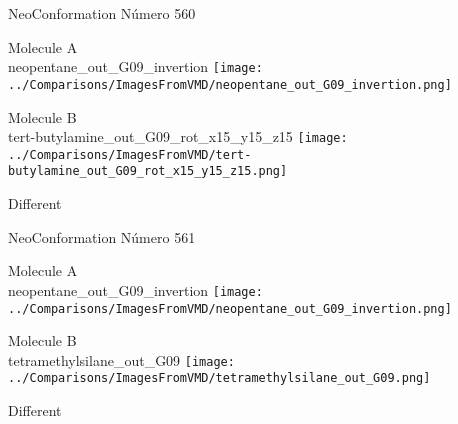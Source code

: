  \newpage

\vtab[-3cm]
\begin{center}
{\large NeoConformation \tab Número 560}
\end{center}
\begin{multicols}{2}
\begin{center}
Molecule A \\ 
neopentane\_out\_G09\_invertion
\texttt{[image: ../Comparisons/ImagesFromVMD/neopentane\_out\_G09\_invertion.png]}
\\
\vtab

\columnbreak
Molecule B \\ 
tert-butylamine\_out\_G09\_rot\_x15\_y15\_z15
\texttt{[image: ../Comparisons/ImagesFromVMD/tert-butylamine\_out\_G09\_rot\_x15\_y15\_z15.png]}
\\
\vtab


\end{center}
\end{multicols}
\begin{center}
\textcolor{NavyBlue}{\Large Different}
\end{center}

 \newpage

\vtab[-3cm]
\begin{center}
{\large NeoConformation \tab Número 561}
\end{center}
\begin{multicols}{2}
\begin{center}
Molecule A \\ 
neopentane\_out\_G09\_invertion
\texttt{[image: ../Comparisons/ImagesFromVMD/neopentane\_out\_G09\_invertion.png]}
\\
\vtab

\columnbreak
Molecule B \\ 
tetramethylsilane\_out\_G09
\texttt{[image: ../Comparisons/ImagesFromVMD/tetramethylsilane\_out\_G09.png]}
\\
\vtab


\end{center}
\end{multicols}
\begin{center}
\textcolor{NavyBlue}{\Large Different}
\end{center}

 \newpage

